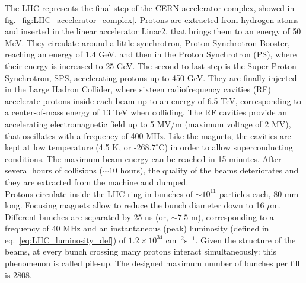 \noindent The LHC represents the final step of the CERN accelerator complex, showed in fig.~\ref{fig:LHC_accelerator_complex}. Protons are extracted from hydrogen atoms and inserted in the linear accelerator Linac2, that brings them to an energy of 50 MeV. They circulate around a little synchrotron, Proton Synchrotron Booster, reaching an energy of 1.4 GeV, and then in the Proton Synchrotron (PS), where their energy is increased to 25 GeV. The second to last step is the Super Proton Synchrotron, SPS, accelerating protons up to 450 GeV. They are finally injected in the Large Hadron Collider, where sixteen radiofrequency cavities (RF) accelerate protons inside each beam up to an energy of 6.5 TeV, corresponding to a center-of-mass energy of 13 TeV when colliding. The RF cavities provide an accelerating electromagnetic field up to 5 MV/m (maximum voltage of 2 MV), that oscillates with a frequency of 400 MHz. Like the magnets, the cavities are kept at low temperature (4.5 K, or -$268.7^{\circ}$C) in order to allow superconducting conditions. The maximum beam energy can be reached in 15 minutes. After several hours of collisions ($\sim 10$ hours), the quality of the beams deteriorates and they are extracted from the machine and dumped.\\

\noindent Protons circulate inside the LHC ring in bunches of $\sim10^{11}$ particles each, 80 mm long. Focusing magnets allow to reduce the bunch diameter down to 16 $\mu$m. Different bunches are separated by 25 ns (or, $\sim 7.5$ m), corresponding to a frequency of 40 MHz and an instantaneous (peak) luminosity (defined in eq.~\ref{eq:LHC_luminosity_def}) of $1.2 \times 10^{34}\mbox{ cm}^{-2} \mbox{s}^{-1}$. Given the structure of the beams, at every bunch crossing many protons interact simultaneously: this phenomenon is called pile-up. The designed maximum number of bunches per fill is 2808.\\

